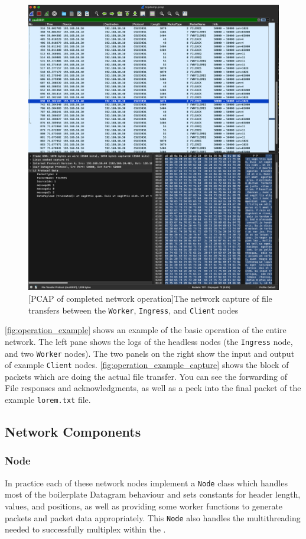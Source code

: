 \documentclass{article}
\newcommand{\code}[1]{\texttt{#1}}
\begin{document}
\begin{figure}[!ht]
\begin{minipage}{.5\textwidth}
		\includegraphics[width=0.8\linewidth]{working_capture.png}
		\captionsetup{width=.75\linewidth}
		[PCAP of completed network operation]{The network capture of file transfers between the \code{Worker}, \code{Ingress}, and \code{Client} nodes}
		\label{fig:operation_example_capture}
	\end{minipage}
\end{figure}

\autoref{fig:operation_example} shows an example of the basic operation of the entire network. The left pane shows the logs of the headless nodes (the \code{Ingress} node, and two \code{Worker} nodes). The two panels on the right show the input and output of example \code{Client} nodes.
\autoref{fig:operation_example_capture} shows the block of packets which are doing the actual file transfer. You can see the forwarding of File responses and acknowledgments, as well as a peek into the final packet of the example \code{lorem.txt} file.

\subsection{Network Components}
\subsubsection{Node}
\label{subsec:Node}
In practice each of these network nodes implement a \code{Node} class which handles most of the boilerplate Datagram behaviour and sets constants for header length, values, and positions, as well as providing some worker functions to generate packets and packet data appropriately. This \code{Node} also handles the multithreading needed to successfully multiplex within the \code{}.
\end{document}
